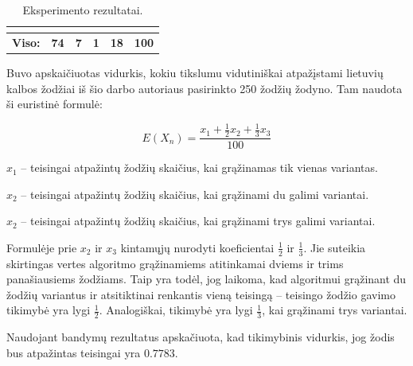 \documentclass[a4paper,12pt]{article}
\begin{document}
\begin{table}[H]
\begin{tabular}{llllll}
		& \textbf{}                                                                              & \textbf{}                                                                               & \textbf{}                                                                               & \textbf{}                                                                                                   & \textbf{}                                                                                                          \\ \hline
		\multicolumn{1}{|l|}{\textbf{Viso:}}                                                                   & \multicolumn{1}{l|}{\textbf{74}}                                                       & \multicolumn{1}{l|}{\textbf{7}}                                                         & \multicolumn{1}{l|}{\textbf{1}}                                                         & \multicolumn{1}{l|}{\textbf{18}}                                                                            & \multicolumn{1}{l|}{\textbf{100}}                                                                                  \\ \hline
	\end{tabular}
	\caption{Eksperimento rezultatai.}
\end{table}

Buvo apskaičiuotas vidurkis, kokiu tikslumu vidutiniškai atpažįstami lietuvių kalbos žodžiai iš šio darbo autoriaus pasirinkto 250 žodžių žodyno. Tam naudota ši euristinė formulė: 

\[ E(X_n) = \frac{x_1 + \frac{1}{2}x_2 + \frac{1}{3}x_3}{100} \]

$x_1$ – teisingai atpažintų žodžių skaičius, kai grąžinamas tik vienas variantas.

$x_2$ – teisingai atpažintų žodžių skaičius, kai grąžinami du galimi variantai.

$x_2$ – teisingai atpažintų žodžių skaičius, kai grąžinami trys galimi variantai.

Formulėje prie $x_2$ ir $x_3$ kintamųjų nurodyti koeficientai \(\frac{1}{2}\) ir \(\frac{1}{3}\). Jie suteikia skirtingas vertes algoritmo grąžinamiems atitinkamai dviems ir trims panašiausiems žodžiams. Taip yra todėl, jog laikoma, kad algoritmui grąžinant du žodžių variantus ir atsitiktinai renkantis vieną teisingą – teisingo žodžio gavimo tikimybė yra lygi \(\frac{1}{2}\). Analogiškai, tikimybė yra lygi \(\frac{1}{3}\), kai grąžinami trys variantai.
 
Naudojant bandymų rezultatus apskačiuota, kad tikimybinis vidurkis, jog žodis bus atpažintas teisingai yra \( 0.7783 \).
\end{document}
